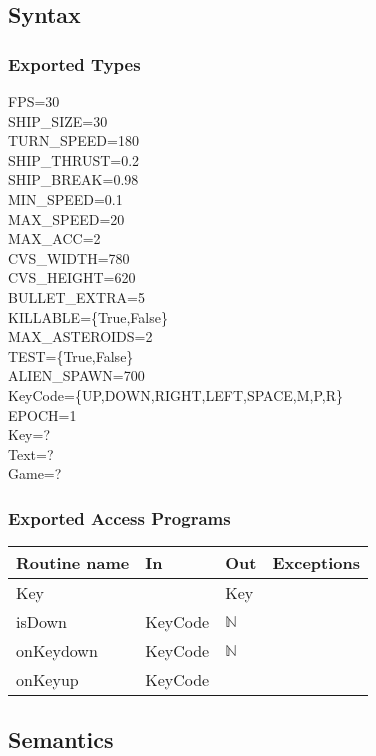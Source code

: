 \documentclass[12pt]{article}
\begin{document}
\subsection*{Syntax}

\subsubsection*{Exported Types}

FPS=30\\
SHIP\_SIZE=30\\
TURN\_SPEED=180\\
SHIP\_THRUST=0.2\\
SHIP\_BREAK=0.98\\
MIN\_SPEED=0.1\\
MAX\_SPEED=20\\
MAX\_ACC=2\\
CVS\_WIDTH=780\\
CVS\_HEIGHT=620\\
BULLET\_EXTRA=5\\
KILLABLE=\{True,False\}\\
MAX\_ASTEROIDS=2\\
TEST=\{True,False\}\\
ALIEN\_SPAWN=700\\
KeyCode=\{UP,DOWN,RIGHT,LEFT,SPACE,M,P,R\}\\
EPOCH=1\\
Key=?\\
Text=?\\
Game=?\\

\subsubsection*{Exported Access Programs}

\begin{tabular}{| l | l | l | l |} %
\hline
\textbf{Routine name} & \textbf{In} & \textbf{Out} & \textbf{Exceptions}\\
\hline
Key &  & Key & ~\\
\hline
isDown & KeyCode & $\mathbb{N}$ & ~\\
\hline
onKeydown & KeyCode & $\mathbb{N}$ & ~\\
\hline
onKeyup & KeyCode &  & ~\\
\hline
\end{tabular}

\subsection*{Semantics}
\end{document}
